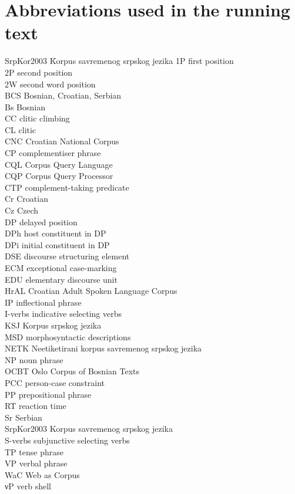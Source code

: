\section*{Abbreviations used in the running text}

\begin{tabbing}
SrpKor2003 \= Korpus savremenog srpskog jezika\kill
1P \> first position\\
2P \> second position\\
2W \> second word position\\
BCS \> Bosnian, Croatian, Serbian\\
Bs \> Bosnian\\
CC \> clitic climbing\\
CL \> clitic\\
CNC \> Croatian National Corpus\\
CP \> complementiser phrase\\
CQL \> Corpus Query Language\\
CQP \> Corpus Query Processor\\
CTP \> complement-taking predicate\\
Cr \> Croatian\\
Cz \> Czech\\
DP \> delayed position\\
DPh \> host constituent in DP\\
DPi \> initial constituent in DP\\
DSE \> discourse structuring element\\
ECM \> exceptional case-marking\\
EDU \> elementary discourse unit\\
HrAL \> Croatian Adult Spoken Language Corpus\\
IP \> inflectional phrase\\
I-verbs \> indicative selecting verbs\\
KSJ \> Korpus srpskog jezika\\
MSD  \> morphosyntactic descriptions \\
NETK \> Neetiketirani korpus savremenog srpskog jezika\\ %
NP \> noun phrase\\
OCBT \> Oslo Corpus of Bosnian Texts\\
PCC \> person-case constraint\\
PP \> prepositional phrase\\
RT \> reaction time \\
Sr \> Serbian\\
SrpKor2003 \> Korpus savremenog srpskog jezika\\
S-verbs \> subjunctive selecting verbs\\
TP \> tense phrase\\
VP \> verbal phrase\\
WaC \> Web as Corpus\\
νP \> verb shell\\
\end{tabbing}

